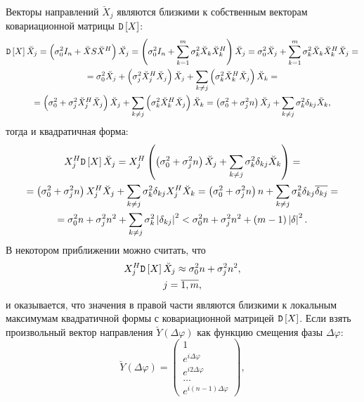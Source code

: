 Векторы направлений $\breve{X}_j$ являются близкими к собственным векторам ковариационной матрицы $\mathtt{D} \left [ X \right ]$:
\begin{multline*}
    \mathtt{D} \left [ X \right ] \breve{X}_j
    = \left ( \sigma_0^2 I_n + \breve{X} S \breve{X}^H \right ) \breve{X_j}
    = \left ( \sigma_0^2 I_n + \sum_{k=1}^m \sigma_k^2 \breve{X}_k \breve{X}_k^H \right ) \breve{X}_j
    = \sigma_0^2 \breve{X}_j + \sum_{k=1}^m \sigma_k^2 \breve{X}_k \breve{X}_k^H \breve{X}_j = \\
    = \sigma_0^2 \breve{X}_j + \left ( \sigma_j^2 \breve{X}_j^H \breve{X}_j \right ) \breve{X}_j + \sum_{k \neq j} \left ( \sigma_k^2 \breve{X}_k^H \breve{X}_j \right ) \breve{X}_k = \\
    = \left ( \sigma_0^2 + \sigma_j^2 \breve{X}_j^H \breve{X}_j \right ) \breve{X}_j + \sum_{k \neq j} \left ( \sigma_k^2 \breve{X}_k^H \breve{X}_j \right ) \breve{X}_k
    = \left ( \sigma_0^2 + \sigma_j^2 n \right ) \breve{X}_j + \sum_{k \neq j} \sigma_k^2 \delta_{kj} \breve{X}_k ,
\end{multline*}
тогда и квадратичная форма:
\begin{multline*}
    X_j^H \mathtt{D} \left [ X \right ] \breve{X}_j
    = X_j^H \left ( \left ( \sigma_0^2 + \sigma_j^2 n \right ) \breve{X}_j + \sum_{k \neq j} \sigma_k^2 \delta_{kj} \breve{X}_k \right ) = \\
    = \left ( \sigma_0^2 + \sigma_j^2 n \right ) X_j^H \breve{X}_j + \sum_{k \neq j} \sigma_k^2 \delta_{kj} X_j^H \breve{X}_k
    = \left ( \sigma_0^2 + \sigma_j^2 n \right ) n + \sum_{k \neq j} \sigma_k^2 \delta_{kj} \overline{\delta_{kj}} = \\
    = \sigma_0^2 n + \sigma_j^2 n^2 + \sum_{k \neq j} \sigma_k^2 \left | \delta_{kj} \right |^2
    < \sigma_0^2 n + \sigma_j^2 n^2 + (m-1) \left | \delta \right |^2 .
\end{multline*}
В некотором приближении можно считать, что
\begin{gather*}
    X_j^H \mathtt{D} \left [ X \right ] \breve{X}_j \approx \sigma_0^2 n + \sigma_j^2 n^2 , \\
    j = \overline{1,m} ,
\end{gather*}
и оказывается, что значения в правой части являются близкими к локальным максимумам квадратичной формы с
ковариационной матрицей $\mathtt{D} \left [ X \right ]$. Если взять произвольный вектор направления $\breve{Y}(\Delta \varphi)$ как функцию смещения фазы $\Delta \varphi$:
\[
    \breve{Y}(\Delta \varphi) =
    \begin{pmatrix}
        1                      \\
        e^{i \Delta \varphi}   \\
        e^{i 2 \Delta \varphi} \\
        \dots                  \\
        e^{i (n-1) \Delta \varphi}
    \end{pmatrix} ,
\]
